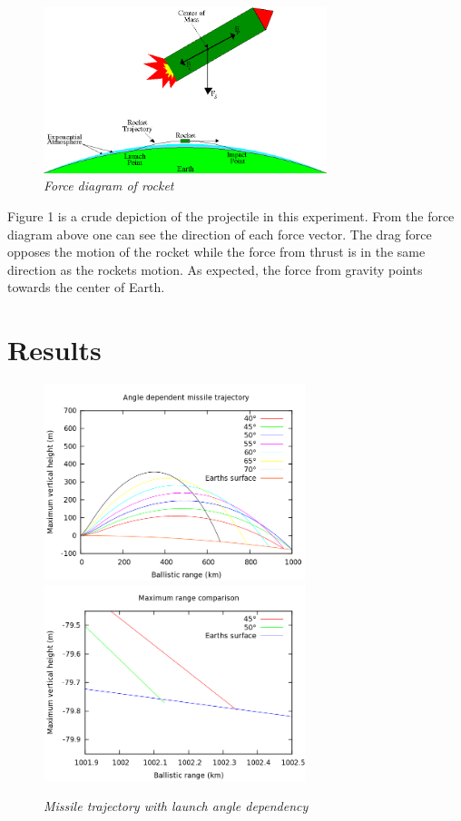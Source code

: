 \documentclass[11pt]{article}
\begin{document}
\begin{figure}[H]
  \begin{center}
\centerline{\includegraphics[width=3.25in]{tet.png}}
\caption{\it \small{Force diagram of rocket \label{fig1}}}
  \end{center}
\end{figure}

Figure 1 is a crude depiction of the projectile in this experiment.  From the force diagram above one can see 
the direction of each force vector.  The drag force opposes the motion of the rocket while the force from thrust 
is in the same direction as the rockets motion.  As expected, the force from gravity points towards the center of 
Earth.


\section{Results}

\begin{figure}[H]
 \centerline{\includegraphics[width=3.0in]{trajectory2.png}\includegraphics[width=3.0in]{trajectoryzoom3.png}}
\caption{\it \small{Missile trajectory with launch angle dependency \label{fig2}}}
\end{figure}
\end{document}
